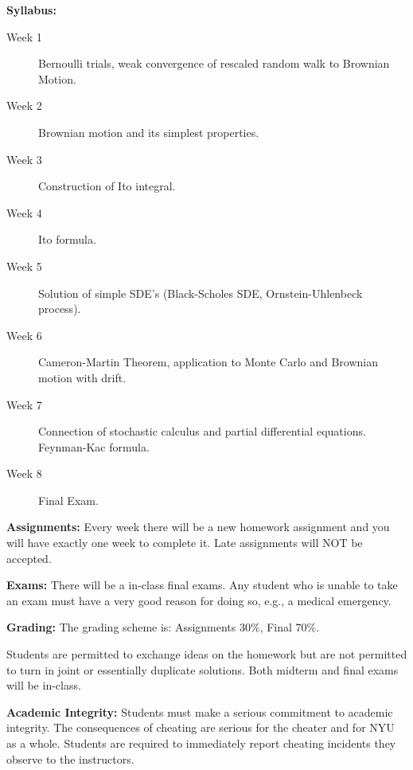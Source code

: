 \documentclass[reqno,psamsfonts, 12pt]{amsart}
\theoremstyle{remark}
\numberwithin{equation}{section}
\begin{document}
\bigskip
\bigskip

\noindent \textbf{Syllabus:}

\begin{description}

\item[Week 1] Bernoulli trials, weak convergence of rescaled random walk to Brownian Motion.

\item[Week 2] Brownian motion and its simplest properties.

\item[Week 3] Construction of Ito integral.

\item[Week 4] Ito formula.

\item[Week 5] Solution of simple SDE's (Black-Scholes SDE, Ornstein-Uhlenbeck process).

\item[Week 6] Cameron-Martin Theorem, application to Monte Carlo and Brownian motion with drift.

\item[Week 7] Connection of stochastic calculus and partial differential equations. Feynman-Kac formula.

\item[Week 8] Final Exam.

\end{description}

\bigskip
\bigskip

\noindent \textbf{Assignments:} Every week there will be a new homework assignment and you will have exactly one week to complete it. Late assignments will NOT be accepted.

\bigskip
\bigskip

\noindent \textbf{Exams:} There will be a in-class final exams. Any student who is unable to take an exam must have a very good reason for doing so, e.g., a medical emergency.

\bigskip
\bigskip

\noindent \textbf{Grading:} The grading scheme is: Assignments 30\%, Final 70\%.

Students are permitted to exchange ideas on the homework but are not permitted to turn in joint or essentially duplicate solutions.
Both midterm and final exams will be in-class.

\bigskip
\bigskip

\noindent \textbf{Academic Integrity:} Students must make a serious commitment to academic integrity. 
The consequences of cheating are serious for the cheater and for NYU as a whole. 
Students are required to immediately report cheating incidents they observe to the instructors.
\end{document}
